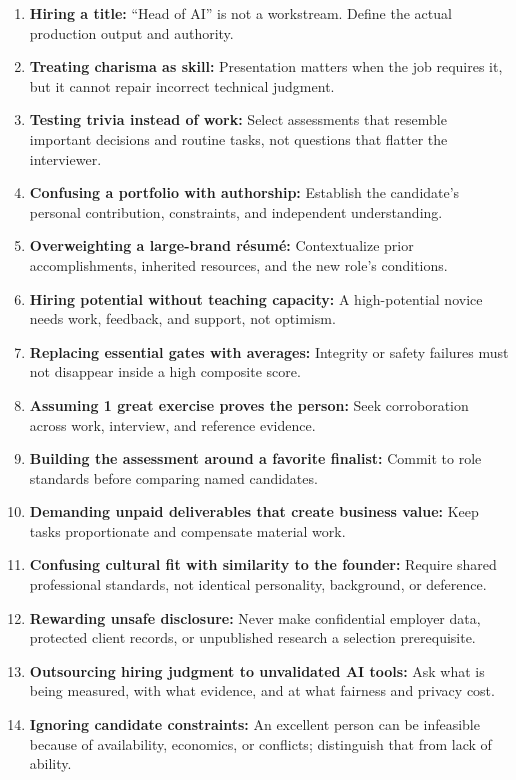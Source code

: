\begin{enumerate}
    \item \textbf{Hiring a title:} ``Head of AI'' is not a workstream. Define the actual production output and authority.
    \item \textbf{Treating charisma as skill:} Presentation matters when the job requires it, but it cannot repair incorrect technical judgment.
    \item \textbf{Testing trivia instead of work:} Select assessments that resemble important decisions and routine tasks, not questions that flatter the interviewer.
    \item \textbf{Confusing a portfolio with authorship:} Establish the candidate's personal contribution, constraints, and independent understanding.
    \item \textbf{Overweighting a large-brand résumé:} Contextualize prior accomplishments, inherited resources, and the new role's conditions.
    \item \textbf{Hiring potential without teaching capacity:} A high-potential novice needs work, feedback, and support, not optimism.
    \item \textbf{Replacing essential gates with averages:} Integrity or safety failures must not disappear inside a high composite score.
    \item \textbf{Assuming 1 great exercise proves the person:} Seek corroboration across work, interview, and reference evidence.
    \item \textbf{Building the assessment around a favorite finalist:} Commit to role standards before comparing named candidates.
    \item \textbf{Demanding unpaid deliverables that create business value:} Keep tasks proportionate and compensate material work.
    \item \textbf{Confusing cultural fit with similarity to the founder:} Require shared professional standards, not identical personality, background, or deference.
    \item \textbf{Rewarding unsafe disclosure:} Never make confidential employer data, protected client records, or unpublished research a selection prerequisite.
    \item \textbf{Outsourcing hiring judgment to unvalidated AI tools:} Ask what is being measured, with what evidence, and at what fairness and privacy cost.
    \item \textbf{Ignoring candidate constraints:} An excellent person can be infeasible because of availability, economics, or conflicts; distinguish that from lack of ability.

\end{enumerate}
